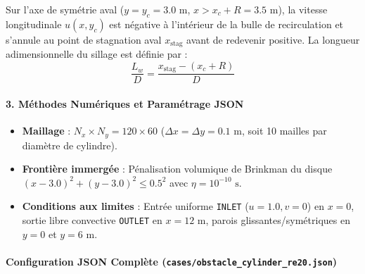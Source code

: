 \documentclass[
  10pt,
]{article}
\providecommand{\tightlist}{%
  \setlength{\itemsep}{0pt}\setlength{\parskip}{0pt}}
\begin{document}
Sur l'axe de symétrie aval (\(y = y_c = 3.0\text{ m}\),
\(x > x_c + R = 3.5\text{ m}\)), la vitesse longitudinale \(u(x, y_c)\)
est négative à l'intérieur de la bulle de recirculation et s'annule au
point de stagnation aval \(x_{\text{stag}}\) avant de redevenir
positive. La longueur adimensionnelle du sillage est définie par :
\[\frac{L_w}{D} = \frac{x_{\text{stag}} - (x_c + R)}{D}\]

\paragraph{3. Méthodes Numériques et Paramétrage
JSON}\label{muxe9thodes-numuxe9riques-et-paramuxe9trage-json-2}

\begin{itemize}
\tightlist
\item
  \textbf{Maillage} : \(N_x \times N_y = 120 \times 60\)
  (\(\Delta x = \Delta y = 0.1\text{ m}\), soit 10 mailles par diamètre
  de cylindre).
\item
  \textbf{Frontière immergée} : Pénalisation volumique de Brinkman du
  disque \((x - 3.0)^2 + (y - 3.0)^2 \le 0.5^2\) avec
  \(\eta = 10^{-10}\text{ s}\).
\item
  \textbf{Conditions aux limites} : Entrée uniforme \texttt{INLET}
  (\(u = 1.0, v = 0\)) en \(x=0\), sortie libre convective
  \texttt{OUTLET} en \(x=12\text{ m}\), parois glissantes/symétriques en
  \(y=0\) et \(y=6\text{ m}\).
\end{itemize}

\paragraph{\texorpdfstring{Configuration JSON Complète
(\texttt{cases/obstacle\_cylinder\_re20.json})}{Configuration JSON Complète (cases/obstacle\_cylinder\_re20.json)}}\label{configuration-json-compluxe8te-casesobstacle_cylinder_re20.json}
\end{document}
